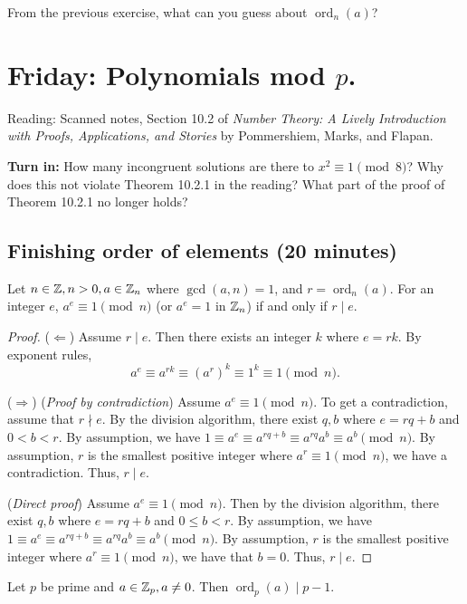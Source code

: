 \documentclass[letterpaper, 11 pt]{article}
\newcommand{\ord}{\operatorname{ord}}
\begin{document}
From the previous exercise, what can you guess about $\ord_n(a)$?
\section{Friday: Polynomials mod $p$.}
Reading: Scanned notes, Section 10.2 of \emph{Number Theory: A Lively Introduction with Proofs, Applications, and Stories} by Pommershiem, Marks, and Flapan.

{\bf Turn in:}
 How many incongruent solutions are there to $x^2\equiv 1 \pmod 8$? Why does this not violate Theorem 10.2.1 in the reading? What part of the proof of Theorem 10.2.1 no longer holds?
\subsection{Finishing order of elements (20 minutes)}
\begin{br}[5 minutes]
 Let $n\in\mathbb Z, n>0, a\in\mathbb Z_n$ where $\gcd(a,n)=1$, and $r=\ord_n(a)$.
 For an integer $e$, $a^e\equiv 1 \pmod n$ (or $a^e=1$ in $\mathbb Z_n$) if and only if $r\mid e$.
\end{br}

\begin{proof}
($\Leftarrow$) Assume $r\mid e$. Then there exists an integer $k$ where $e=rk$. By exponent rules, \[a^e\equiv a^{rk}\equiv(a^r)^k\equiv 1^k\equiv 1 \pmod n.\]

($\Rightarrow$)
(\emph{Proof by contradiction}) Assume $a^e\equiv 1 \pmod n$. To get a contradiction, assume that $r\nmid e$. By the division algorithm, there exist $q,b$ where $e=rq+b$ and $0< b<r$. By assumption, we have $1\equiv a^e\equiv a^{rq+b}\equiv a^{rq}a^b\equiv a^b \pmod n$. By assumption, $r$ is the smallest positive integer where $a^r\equiv 1 \pmod n$, we have a contradiction. Thus, $r\mid e$.

(\emph{Direct proof}) Assume $a^e\equiv 1 \pmod n$. Then by the division algorithm, there exist $q,b$ where $e=rq+b$ and $0\leq b<r$. By assumption, we have $1\equiv a^e\equiv a^{rq+b}\equiv a^{rq}a^b\equiv a^b \pmod n$. By assumption, $r$ is the smallest positive integer where $a^r\equiv 1 \pmod n$, we have that $b=0$. Thus, $r\mid e$.
\end{proof}

\begin{thm}
 Let $p$ be prime and $a\in\mathbb Z_p, a\neq0$. Then $\ord_p(a)\mid p-1$. 
 \end{thm}
 
\end{document}
